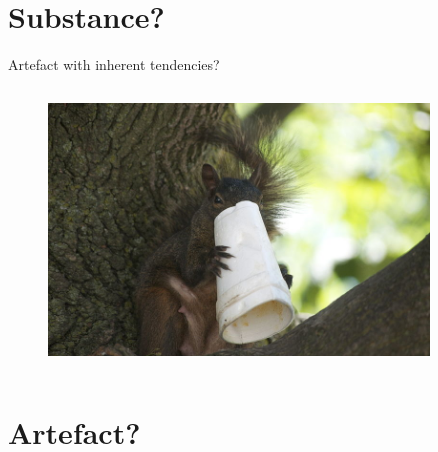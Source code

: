 \documentclass[xcolor=dvipsnames]{beamer}
\begin{document}
\section{Substance?}


\begin{frame}[fragile]{Artefact with inherent tendencies?}
  \begin{columns}[T] %
    \begin{column}{0.99\textwidth}
      \begin{figure}[H]
        \centering
        \includegraphics[width=0.9\textwidth]{styrofoam}
      \end{figure}
    \end{column}%
  \end{columns}
\end{frame}


\section{Artefact?}
\end{document}
